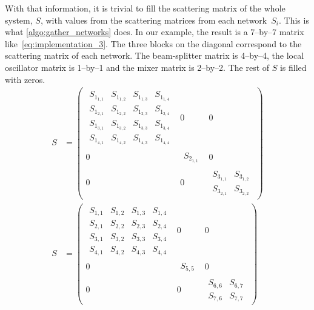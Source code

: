 With that information, it is trivial to fill the scattering matrix of the whole system, $S$, with values from the scattering matrices from each network~$S_i$.
This is what \cref{algo:gather_networks} does.
In our example, the result is a 7--by--7 matrix like~\cref{eq:implementation_3}.
The three blocks on the diagonal correspond to the scattering matrix of each network.
The beam-splitter matrix is 4--by--4, the local oscillator matrix is 1--by--1 and the mixer matrix is 2--by--2.
The rest of $S$ is filled with zeros.
\begin{align}
    S
    &=
    \begin{pmatrix}
        \begin{matrix}
            S_{1_{1,1}} & S_{1_{1,2}} & S_{1_{1,3}} & S_{1_{1,4}} \\
            S_{1_{2,1}} & S_{1_{2,2}} & S_{1_{2,3}} & S_{1_{2,4}} \\
            S_{1_{3,1}} & S_{1_{3,2}} & S_{1_{3,3}} & S_{1_{3,4}} \\
            S_{1_{4,1}} & S_{1_{4,2}} & S_{1_{4,3}} & S_{1_{4,4}}
        \end{matrix}
        & 0 & 0
        \\
        0 &
        \begin{matrix}
            S_{2_{1,1}}
        \end{matrix}
        & 0
        \\
        0&0&
        \begin{matrix}
            S_{3_{1,1}} & S_{3_{1,2}}\\
            S_{3_{2,1}} & S_{3_{2,2}}
        \end{matrix}
    \end{pmatrix}
    \\
    S
    &=
    \begin{pmatrix}
        \begin{matrix}
            S_{1,1} & S_{1,2} & S_{1,3} & S_{1,4} \\
            S_{2,1} & S_{2,2} & S_{2,3} & S_{2,4} \\
            S_{3,1} & S_{3,2} & S_{3,3} & S_{3,4} \\
            S_{4,1} & S_{4,2} & S_{4,3} & S_{4,4}
        \end{matrix}
        & 0 & 0
        \\
        0 &
        \begin{matrix}
            S_{5,5}
        \end{matrix}
        & 0
        \\
        0&0&
        \begin{matrix}
            S_{6,6} & S_{6,7}\\
            S_{7,6} & S_{7,7}
        \end{matrix}
    \end{pmatrix}
    \label{eq:implementation_3}
\end{align}

